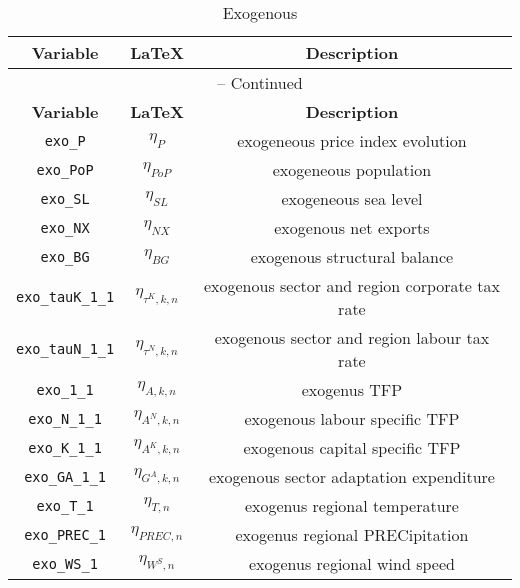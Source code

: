 \begin{center}
\begin{longtable}{ccc}
\caption{Exogenous}\\%
\hline%
\multicolumn{1}{c}{\textbf{Variable}} &
\multicolumn{1}{c}{\textbf{\LaTeX}} &
\multicolumn{1}{c}{\textbf{Description}}\\%
\hline\hline%
\endfirsthead
\multicolumn{3}{c}{{\tablename} \thetable{} -- Continued}\\%
\hline%
\multicolumn{1}{c}{\textbf{Variable}} &
\multicolumn{1}{c}{\textbf{\LaTeX}} &
\multicolumn{1}{c}{\textbf{Description}}\\%
\hline\hline%
\endhead
\texttt{exo\_P} & ${\eta_{P}}$ & exogeneous price index evolution\\
\texttt{exo\_PoP} & ${\eta_{PoP}}$ & exogeneous population\\
\texttt{exo\_SL} & ${\eta_{SL}}$ & exogeneous sea level\\
\texttt{exo\_NX} & ${\eta_{NX}}$ & exogenous net exports\\
\texttt{exo\_BG} & ${\eta_{BG}}$ & exogenous structural balance\\
\texttt{exo\_tauK\_1\_1} & ${\eta_{\tau^{K},k,n}}$ & exogenous sector and region corporate tax rate\\
\texttt{exo\_tauN\_1\_1} & ${\eta_{\tau^{N},k,n}}$ & exogenous sector and region labour tax rate\\
\texttt{exo\_1\_1} & ${\eta_{A,k,n}}$ & exogenus TFP\\
\texttt{exo\_N\_1\_1} & ${\eta_{A^{N},k,n}}$ & exogenous labour specific TFP\\
\texttt{exo\_K\_1\_1} & ${\eta_{A^{K},k,n}}$ & exogenous capital specific TFP\\
\texttt{exo\_GA\_1\_1} & ${\eta_{G^{A},k,n}}$ & exogenous sector adaptation expenditure\\
\texttt{exo\_T\_1} & ${\eta_{T,n}}$ & exogenus regional temperature\\
\texttt{exo\_PREC\_1} & ${\eta_{PREC,n}}$ & exogenus regional PRECipitation\\
\texttt{exo\_WS\_1} & ${\eta_{W^{S},n}}$ & exogenus regional wind speed\\
\hline%
\end{longtable}
\end{center}
